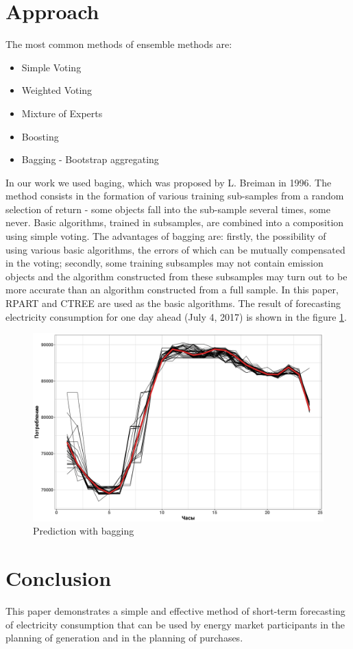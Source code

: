 \documentclass[11pt]{article}
\begin{document}
\section{Approach}
\label{sec:methods}
The most common methods of ensemble methods are:
\begin{itemize}
    \item Simple Voting
    \item Weighted Voting
    \item Mixture of Experts
    \item Boosting
    \item Bagging - Bootstrap aggregating \cite{Breiman1996}
\end{itemize}
In our work we used baging, which was proposed by L. Breiman in 1996. The method
consists in the formation of various training sub-samples from a random
selection of return - some objects fall into the sub-sample several times, some
never. Basic algorithms, trained in subsamples, are combined into a composition
using simple voting. The advantages of bagging are: firstly, the possibility of
using various basic algorithms, the errors of which can be mutually compensated
in the voting; secondly, some training subsamples may not contain emission
objects and the algorithm constructed from these subsamples may turn out to be
more accurate than an algorithm constructed from a full sample. In this paper,
RPART and CTREE are used as the basic algorithms. The result of forecasting
electricity consumption for one day ahead (July 4, 2017) is shown in the figure
\ref{fig:prediction}.
\begin{figure}
  \centering
  \includegraphics[width=0.6\linewidth]{prediction.jpg}
  \caption{Prediction with bagging}
  \label{fig:prediction}
\end{figure}



\section{Conclusion}
This paper demonstrates a simple and effective method of short-term forecasting
of electricity consumption that can be used by energy market participants in the
planning of generation and in the planning of purchases.
\end{document}
